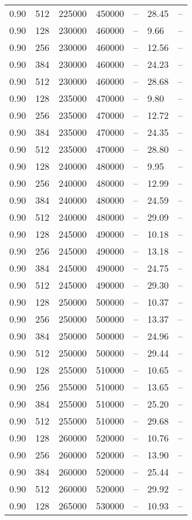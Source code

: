\begin{tabular}{l|l|l|l|l|l|l}
0.90 & 512 & 225000 & 450000 & -- & 28.45 & --\\
0.90 & 128 & 230000 & 460000 & -- &  9.66 & --\\
0.90 & 256 & 230000 & 460000 & -- & 12.56 & --\\
0.90 & 384 & 230000 & 460000 & -- & 24.23 & --\\
0.90 & 512 & 230000 & 460000 & -- & 28.68 & --\\
0.90 & 128 & 235000 & 470000 & -- &  9.80 & --\\
0.90 & 256 & 235000 & 470000 & -- & 12.72 & --\\
0.90 & 384 & 235000 & 470000 & -- & 24.35 & --\\
0.90 & 512 & 235000 & 470000 & -- & 28.80 & --\\
0.90 & 128 & 240000 & 480000 & -- &  9.95 & --\\
0.90 & 256 & 240000 & 480000 & -- & 12.99 & --\\
0.90 & 384 & 240000 & 480000 & -- & 24.59 & --\\
0.90 & 512 & 240000 & 480000 & -- & 29.09 & --\\
0.90 & 128 & 245000 & 490000 & -- & 10.18 & --\\
0.90 & 256 & 245000 & 490000 & -- & 13.18 & --\\
0.90 & 384 & 245000 & 490000 & -- & 24.75 & --\\
0.90 & 512 & 245000 & 490000 & -- & 29.30 & --\\
0.90 & 128 & 250000 & 500000 & -- & 10.37 & --\\
0.90 & 256 & 250000 & 500000 & -- & 13.37 & --\\
0.90 & 384 & 250000 & 500000 & -- & 24.96 & --\\
0.90 & 512 & 250000 & 500000 & -- & 29.44 & --\\
0.90 & 128 & 255000 & 510000 & -- & 10.65 & --\\
0.90 & 256 & 255000 & 510000 & -- & 13.65 & --\\
0.90 & 384 & 255000 & 510000 & -- & 25.20 & --\\
0.90 & 512 & 255000 & 510000 & -- & 29.68 & --\\
0.90 & 128 & 260000 & 520000 & -- & 10.76 & --\\
0.90 & 256 & 260000 & 520000 & -- & 13.90 & --\\
0.90 & 384 & 260000 & 520000 & -- & 25.44 & --\\
0.90 & 512 & 260000 & 520000 & -- & 29.92 & --\\
0.90 & 128 & 265000 & 530000 & -- & 10.93 & --\\

\end{tabular}
